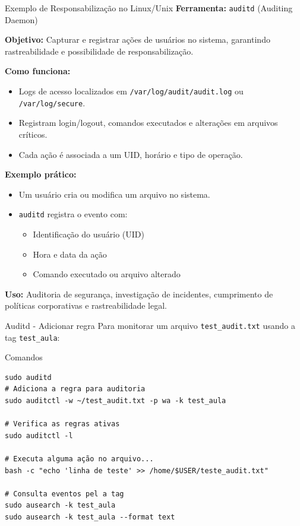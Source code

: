 \begin{frame}{Exemplo de Responsabilização no Linux/Unix}
\textbf{Ferramenta:} \texttt{auditd} (Auditing Daemon)

\medskip
\textbf{Objetivo:} Capturar e registrar ações de usuários no sistema, garantindo rastreabilidade e possibilidade de responsabilização.

\medskip
\textbf{Como funciona:}
\begin{itemize}
    \item Logs de acesso localizados em \texttt{/var/log/audit/audit.log} ou \texttt{/var/log/secure}.
    \item Registram login/logout, comandos executados e alterações em arquivos críticos.
    \item Cada ação é associada a um UID, horário e tipo de operação.
\end{itemize}

\medskip
\textbf{Exemplo prático:}
\begin{itemize}
    \item Um usuário cria ou modifica um arquivo no sistema.
    \item \texttt{auditd} registra o evento com:
    \begin{itemize}
        \item Identificação do usuário (UID)
        \item Hora e data da ação
        \item Comando executado ou arquivo alterado
    \end{itemize}
   
\end{itemize}

\medskip
\textbf{Uso:} Auditoria de segurança, investigação de incidentes, cumprimento de políticas corporativas e rastreabilidade legal.
\end{frame}

\begin{frame}[fragile]{Auditd - Adicionar regra }
Para monitorar um arquivo \texttt{test\_audit.txt} usando a tag \texttt{test\_aula}:

\begin{block}{Comandos}
\begin{verbatim}
sudo auditd
# Adiciona a regra para auditoria
sudo auditctl -w ~/test_audit.txt -p wa -k test_aula

# Verifica as regras ativas
sudo auditctl -l

# Executa alguma ação no arquivo...
bash -c "echo 'linha de teste' >> /home/$USER/teste_audit.txt"

# Consulta eventos pel a tag
sudo ausearch -k test_aula
sudo ausearch -k test_aula --format text
\end{verbatim}
\end{block}
\end{frame}

